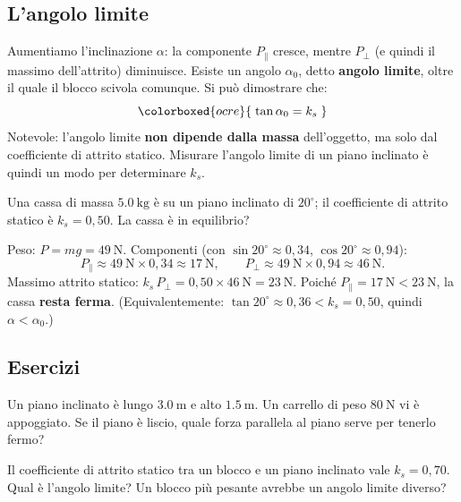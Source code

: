 \subsection{L'angolo limite}
Aumentiamo l'inclinazione $\alpha$: la componente $P_\parallel$ cresce, mentre $P_\perp$ (e quindi il massimo dell'attrito) diminuisce. Esiste un angolo $\alpha_0$, detto \textbf{angolo limite}, oltre il quale il blocco scivola comunque. Si può dimostrare che:
\[
\colorboxed{ocre}{\; \tan\alpha_0 = k_s \;}
\]
Notevole: l'angolo limite \textbf{non dipende dalla massa} dell'oggetto, ma solo dal coefficiente di attrito statico. Misurare l'angolo limite di un piano inclinato è quindi un modo per determinare $k_s$.

\begin{testexample}
Una cassa di massa $\SI{5,0}{\kilo\gram}$ è su un piano inclinato di $20^\circ$; il coefficiente di attrito statico è $k_s = 0,50$. La cassa è in equilibrio?

Peso: $P = mg = \SI{49}{\newton}$. Componenti (con $\sin 20^\circ \approx 0,34$, $\cos 20^\circ \approx 0,94$):
\[
P_\parallel \approx \SI{49}{\newton}\times 0,34 \approx \SI{17}{\newton}, \qquad P_\perp \approx \SI{49}{\newton}\times 0,94 \approx \SI{46}{\newton}.
\]
Massimo attrito statico: $k_s\,P_\perp = 0,50 \times \SI{46}{\newton} = \SI{23}{\newton}$. Poiché $P_\parallel = \SI{17}{\newton} < \SI{23}{\newton}$, la cassa \textbf{resta ferma}. (Equivalentemente: $\tan 20^\circ \approx 0,36 < k_s = 0,50$, quindi $\alpha < \alpha_0$.)
\end{testexample}

\subsection{Esercizi}

\begin{esercizio}
Un piano inclinato è lungo $\SI{3,0}{\meter}$ e alto $\SI{1,5}{\meter}$. Un carrello di peso $\SI{80}{\newton}$ vi è appoggiato. Se il piano è liscio, quale forza parallela al piano serve per tenerlo fermo?\\
\end{esercizio}

\begin{esercizio}
Il coefficiente di attrito statico tra un blocco e un piano inclinato vale $k_s = 0,70$. Qual è l'angolo limite? Un blocco più pesante avrebbe un angolo limite diverso?\\
\end{esercizio}

